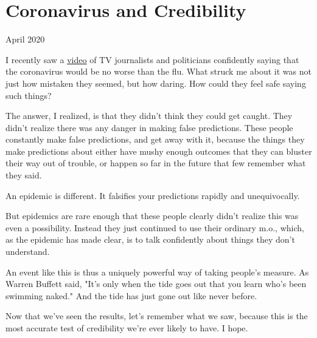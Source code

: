 \chapter{Coronavirus and Credibility}


            
              
                

April 2020

I recently saw a
                  \href{https://www.youtube.com/watch?v=NAh4uS4f78o}{\underline{video}}
                  of TV journalists and politicians confidently saying that the
                  coronavirus would be no worse than the flu. What struck me
                  about it was not just how mistaken they seemed, but how
                  daring. How could they feel safe saying such things?

The
                  answer, I realized, is that they didn't think they could get
                  caught. They didn't realize there was any danger in making
                  false predictions. These people constantly make false
                  predictions, and get away with it, because the things they
                  make predictions about either have mushy enough outcomes that
                  they can bluster their way out of trouble, or happen so far in
                  the future that few remember what they said.

An
                  epidemic is different. It falsifies your predictions rapidly
                  and unequivocally.

But epidemics are rare enough
                  that these people clearly didn't realize this was even a
                  possibility. Instead they just continued to use their ordinary
                  m.o., which, as the epidemic has made clear, is to talk
                  confidently about things they don't understand.

An
                  event like this is thus a uniquely powerful way of taking
                  people's measure. As Warren Buffett said, "It's only when the
                  tide goes out that you learn who's been swimming naked." And
                  the tide has just gone out like never before.

Now
                  that we've seen the results, let's remember what we saw,
                  because this is the most accurate test of credibility we're
                  ever likely to have. I hope.




              
            
          
